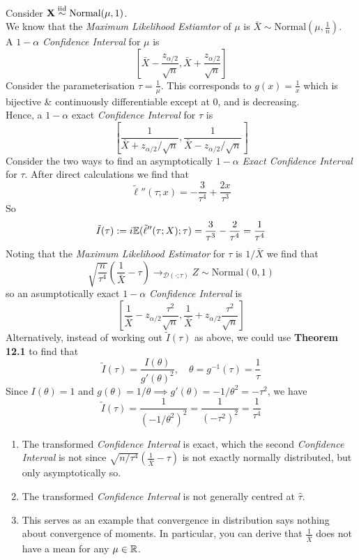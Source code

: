 \documentclass[11pt,a4paper]{article}
\begin{document}
\example{}
Consider $\textbf{X}\overset{\text{iid}}{\sim}\text{Normal}(\mu,1)$.\\
We know that the \textit{Maximum Likelihood Estiamtor} of $\mu$ is $\bar{X}\sim\text{Normal}\left(\mu,\frac{1}{n}\right)$.\\
A $1-\alpha$ \textit{Confidence Interval} for $\mu$ is
$$\left[\bar{X}-\dfrac{z_{\alpha/2}}{\sqrt{n}},\bar{X}+\dfrac{z_{\alpha/2}}{\sqrt{n}}\right]$$
Consider the parameterisation $\tau=\frac{1}{\mu}$. This corresponds to $g(x)=\frac{1}{x}$ which is bijective \& continuously differentiable except at 0, and is decreasing.\\
Hence, a $1-\alpha$ exact \textit{Confidence Interval} for $\tau$ is
$$\left[\frac{1}{\bar{X}+z_{\alpha/2}/\sqrt{n}},\frac{1}{\bar{X}-z_{\alpha/2}/\sqrt{n}}\right]$$
Consider the two ways to find an asymptotically $1-\alpha$ \textit{Exact Confidence Interval} for $\tau$. After direct calculations we find that
$$\tilde\ell''(\tau;x)=-\frac{3}{\tau^4}+\frac{2x}{\tau^3}$$
So
$$\tilde{I}(\tau):=i\mathbb{E}(\tilde\ell''(\tau;X);\tau)=\frac{3}{\tau^3}-\frac{2}{\tau^4}=\frac{1}{\tau^4}$$
Noting that the \textit{Maximum Likelihood Estimator} for $\tau$ is $1/\bar{X}$ we find that
$$\sqrt{\frac{n}{\tau^4}}\left(\frac{1}{\bar{X}}-\tau\right)\to_{\mathcal{D}(\cdot;\tau)}Z\sim\text{Normal}(0,1)$$
so an asumptotically exact $1-\alpha$ \textit{Confidence Interval} is
$$\left[\frac{1}{\bar{X}}-z_{\alpha/2}\frac{\tau^2}{\sqrt{n}},\frac{1}{\bar{X}}+z_{\alpha/2}\frac{\tau^2}{\sqrt{n}}\right]$$
Alternatively, instead of working out $\tilde{I}(\tau)$ as above, we could use \textbf{Theorem 12.1} to find that
$$\tilde{I}(\tau)=\frac{I(\theta)}{g'(\theta)^2},\quad\theta=g^{-1}(\tau)=\frac{1}{\tau}$$
Since $I(\theta)=1$ and $g(\theta)=1/\theta\implies g'(\theta)=-1/\theta^2=-\tau^2$, we have
$$\tilde{I}(\tau)=\frac{1}{(-1/\theta^2)^2}=\frac{1}{(-\tau^2)^2}=\frac{1}{\tau^4}$$

\begin{enumerate}[label=\roman*)]
	\item The transformed \textit{Confidence Interval} is exact, which the second \textit{Confidence Interval} is not since $\sqrt{n/\tau^4}\left(\frac{1}{\bar{X}}-\tau\right)$ is not exactly normally distributed, but only asymptotically so.
	\item The transformed \textit{Confidence Interval} is not generally centred at $\hat\tau$.
	\item This serves as an example that convergence in distribution says nothing about convergence of moments. In particular, you can derive that $\frac{1}{\bar{X}}$ does not have a mean for any $\mu\in\mathbb{R}$.
\end{enumerate}
\end{document}
